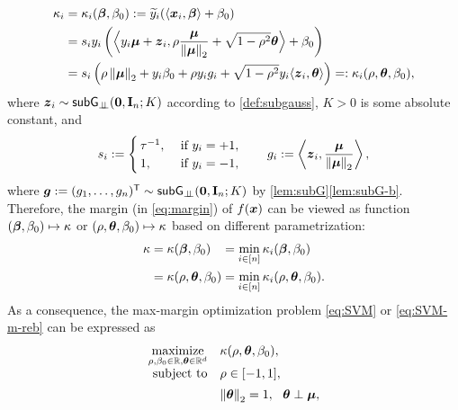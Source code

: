 \begin{align}
        \kappa_i  & =  \kappa_i({\boldsymbol{\beta}}, \beta_0) 
        : = \widetilde y_i ( \langle \text{\boldmath $x$}_i, {\boldsymbol{\beta}} \rangle + \beta_0 )  \nonumber \\
        & = s_i y_i \left( \Bigl\langle y_i \text{\boldmath $\mu$} + \text{\boldmath $z$}_i, \rho\frac{{\boldsymbol{\mu}}}{\left\|{{\boldsymbol{\mu}}}\right\|_2} + \sqrt{1 - \rho^2}{\boldsymbol{\theta}}  \Bigr\rangle  + \beta_0 \right) \nonumber \\
        & = s_i \left( \rho \left\|{{\boldsymbol{\mu}}}\right\|_2 + y_i\beta_0 + \rho y_i g_i + \sqrt{1 - \rho^2} y_i \langle \text{\boldmath $z$}_i, {\boldsymbol{\theta}} \rangle \right) 
        = : \kappa_i(\rho, {\boldsymbol{\theta}}, \beta_0),
        \label{eq:logits}
\end{align}
where $\text{\boldmath $z$}_i \sim {\sf{subG}_{\perp\!\!\!\perp}}(\mathrm{\bf 0}, \mathrm{\bf I}_n; K)$ according to \cref{def:subgauss}, $K > 0$ is some absolute constant, and
\begin{equation*}
    s_i := \begin{cases} 
    \, \tau^{-1}, & \ \text{if} \ y_i = +1, \\
    \, 1,         & \ \text{if} \ y_i = -1, \end{cases}
\qquad
    g_i := \left\langle \text{\boldmath $z$}_i, \frac{{\boldsymbol{\mu}}}{\left\|{{\boldsymbol{\mu}}}\right\|_2} \right\rangle,
\end{equation*}
where ${\boldsymbol{g}} := (g_1, \dots, g_n)^{\sf T} \sim {\sf{subG}_{\perp\!\!\!\perp}}(\mathrm{\bf 0}, \mathrm{\bf I}_n; K)$ by \cref{lem:subG}\ref{lem:subG-b}. Therefore, the margin (in \cref{eq:margin}) of $f(\text{\boldmath $x$})$ can be viewed as function $({\boldsymbol{\beta}}, \beta_0) \mapsto \kappa$ or $(\rho, {\boldsymbol{\theta}}, \beta_0) \mapsto \kappa$ based on different parametrization:
\begin{equation}\label{eq:margin_reparam}
    \begin{aligned}
        \kappa & = \mathmakebox[\widthof{$\kappa(\rho, \vtheta, \beta_0)$}][l]{\kappa(\vbeta, \beta_0)} = \min_{i \in [n]} \kappa_i(\vbeta, \beta_0) \\
        & = \kappa(\rho, \vtheta, \beta_0) = \min_{i \in [n]} \kappa_i(\rho, \vtheta, \beta_0).
    \end{aligned}
\end{equation}
As a consequence, the max-margin optimization problem \cref{eq:SVM} or \eqref{eq:SVM-m-reb} can be expressed as
\begin{equation}
	\label{eq:SVM-rho_theta}
    \begin{array}{rl}
    \maximize\limits_{ \rho, \beta_0 \in \R, \vtheta \in \R^{d} } & %
    \kappa(\rho, \vtheta, \beta_0), \\
    \text{subject to} 
	& \rho \in [-1, 1],  
    \vphantom{\maximize\limits_{ \rho }}  \\ 
        & \norm{\vtheta}_2 = 1,  \ \  
    \vtheta \perp \vmu,
    \end{array}
\end{equation}
